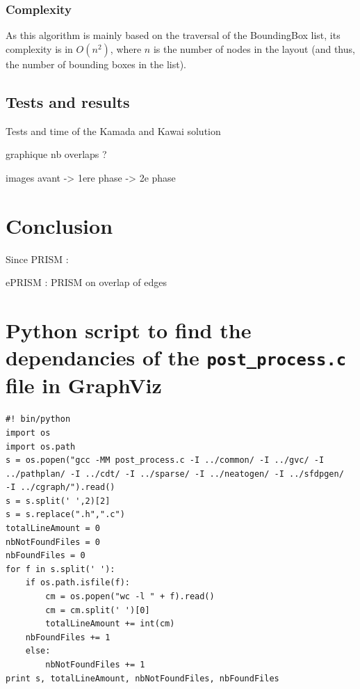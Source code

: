 \documentclass[12pt]{report}
\begin{document}
\subsection{Complexity}

As this algorithm is mainly based on the traversal of the BoundingBox list, its complexity is in $O(n^2)$, where $n$ is the number of nodes in the layout (and thus, the number of bounding boxes in the list). 

\section{Tests and results}
Tests and time of the Kamada and Kawai solution

graphique nb overlaps ?

images avant -> 1ere phase -> 2e phase

\chapter{Conclusion}

Since PRISM :

ePRISM : PRISM on overlap of edges \cite{Hu09}

\appendix
\chapter{Python script to find the dependancies of the \texttt{post\_process.c} file in GraphViz}

\begin{verbatim}
#! bin/python
import os
import os.path
s = os.popen("gcc -MM post_process.c -I ../common/ -I ../gvc/ -I 
../pathplan/ -I ../cdt/ -I ../sparse/ -I ../neatogen/ -I ../sfdpgen/ 
-I ../cgraph/").read()
s = s.split(' ',2)[2]
s = s.replace(".h",".c")
totalLineAmount = 0
nbNotFoundFiles = 0
nbFoundFiles = 0
for f in s.split(' '):
    if os.path.isfile(f):
        cm = os.popen("wc -l " + f).read()
        cm = cm.split(' ')[0]
        totalLineAmount += int(cm)
	nbFoundFiles += 1
    else:
        nbNotFoundFiles += 1
print s, totalLineAmount, nbNotFoundFiles, nbFoundFiles
\end{verbatim}



\end{document}
